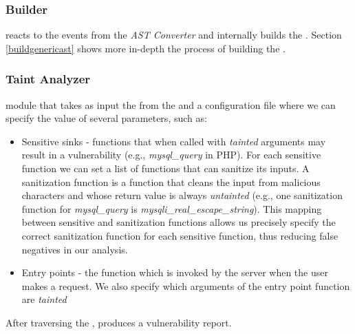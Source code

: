 \subsubsection{\astname{} Builder} reacts to the events from the \textit{AST Converter} and internally builds the \astname{}. Section \ref{buildgenericast} shows more in-depth the process of building the \astname{}. 

\subsubsection{Taint Analyzer} module that takes as input the \astname{} from the \astbuilder{} and a configuration file where we can specify the value of several parameters, such as:
\begin{itemize}
    \item Sensitive sinks - functions that when called with \textit{tainted} arguments may result in a vulnerability (e.g., \textit{mysql\_query} in PHP). For each sensitive function we can set a list of functions that can sanitize its inputs. A sanitization function is a function that cleans the input from malicious characters and whose return value is always \textit{untainted} (e.g., one sanitization function for \textit{mysql\_query} is \textit{mysqli\_real\_escape\_string}). This mapping between sensitive and sanitization functions allows us precisely specify the correct sanitization function for each sensitive function, thus reducing false negatives in our analysis.
    \item Entry points - the function which is invoked by the server when the user makes a request. We also specify which arguments of the entry point function are \textit{tainted}
\end{itemize}

After traversing the \astname{}, \toolname{} produces a vulnerability report. 

